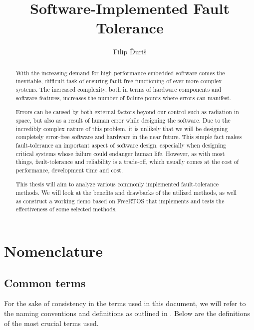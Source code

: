 \documentclass[12pt, letterpaper]{article}
\title{
    \Huge \textbf{Software-Implemented Fault Tolerance}
}
\author{Filip Ďuriš}
\begin{document}



\newpage

\begin{abstract}
With the increasing demand for high-performance embedded software comes the inevitable, difficult task of ensuring fault-free functioning of ever-more complex systems. The increased complexity, both in terms of hardware components and software features, increases the number of failure points where errors can manifest.

Errors can be caused by both external factors beyond our control such as radiation in space, but also as a result of human error while designing the software. Due to the incredibly complex nature of this problem, it is unlikely that we will be designing completely error-free software and hardware in the near future. This simple fact makes fault-tolerance an important aspect of software design, especially when designing critical systems whose failure could endanger human life. However, as with most things, fault-tolerance and reliability is a trade-off, which usually comes at the cost of performance, development time and cost.

This thesis will aim to analyze various commonly implemented fault-tolerance methods. We will look at the benefits and drawbacks of the utilized methods, as well as construct a working demo based on FreeRTOS that implements and tests the effectiveness of some selected methods.
\end{abstract}

\newpage

\tableofcontents

\newpage

\section{Nomenclature}

\subsection{Common terms}

For the sake of consistency in the terms used in this document, we will refer to the naming conventions and definitions as outlined in \cite{1335465}. Below are the definitions of the most crucial terms used. \\
\end{document}
